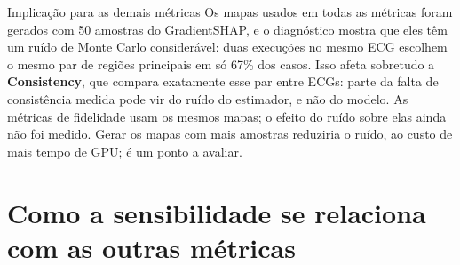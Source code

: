 \documentclass[11pt,a4paper]{article}
\begin{document}
\begin{infobox}[warn]{Implicação para as demais métricas}
Os mapas usados em todas as métricas foram gerados com 50 amostras do GradientSHAP, e o diagnóstico mostra que eles têm um ruído de Monte Carlo considerável: duas execuções no mesmo ECG escolhem o mesmo par de regiões principais em só 67\% dos casos. Isso afeta sobretudo a \textbf{Consistency}, que compara exatamente esse par entre ECGs: parte da falta de consistência medida pode vir do ruído do estimador, e não do modelo. As métricas de fidelidade usam os mesmos mapas; o efeito do ruído sobre elas ainda não foi medido. Gerar os mapas com mais amostras reduziria o ruído, ao custo de mais tempo de GPU; é um ponto a avaliar.
\end{infobox}

\section{Como a sensibilidade se relaciona com as outras métricas}
\end{document}
